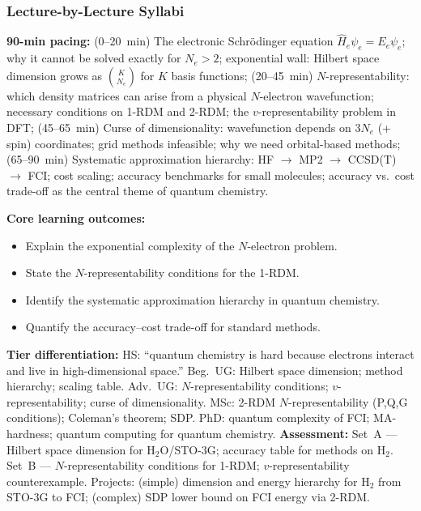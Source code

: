 \documentclass[11pt,a4paper]{article}
\begin{document}
\subsubsection*{Lecture-by-Lecture Syllabi}

\begin{tcolorbox}[chembox, title={Module~III.2 --- Lecture L01: The Quantum Many-Body Problem in Chemistry}]
\textbf{90-min pacing:} (0--20~min) The electronic Schr\"odinger equation $\hat{H}_e\psi_e=E_e\psi_e$; why it cannot be solved exactly for $N_e>2$; exponential wall: Hilbert space dimension grows as $\binom{K}{N_e}$ for $K$ basis functions; (20--45~min) $N$-representability: which density matrices can arise from a physical $N$-electron wavefunction; necessary conditions on 1-RDM and 2-RDM; the $v$-representability problem in DFT; (45--65~min) Curse of dimensionality: wavefunction depends on $3N_e$ (+ spin) coordinates; grid methods infeasible; why we need orbital-based methods; (65--90~min) Systematic approximation hierarchy: HF $\to$ MP2 $\to$ CCSD(T) $\to$ FCI; cost scaling; accuracy benchmarks for small molecules; accuracy vs.\ cost trade-off as the central theme of quantum chemistry.

\medskip\textbf{Core learning outcomes:}
\begin{itemize}[leftmargin=1.4em,topsep=2pt,itemsep=1pt]
  \item Explain the exponential complexity of the $N$-electron problem.
  \item State the $N$-representability conditions for the 1-RDM.
  \item Identify the systematic approximation hierarchy in quantum chemistry.
  \item Quantify the accuracy--cost trade-off for standard methods.
\end{itemize}
\medskip\textbf{Tier differentiation:}
HS: ``quantum chemistry is hard because electrons interact and live in high-dimensional space.''
Beg.\ UG: Hilbert space dimension; method hierarchy; scaling table.
Adv.\ UG: $N$-representability conditions; $v$-representability; curse of dimensionality.
MSc: 2-RDM $N$-representability (P,Q,G conditions); Coleman's theorem; SDP.
PhD: quantum complexity of FCI; MA-hardness; quantum computing for quantum chemistry.
\medskip\textbf{Assessment:}
Set~A --- Hilbert space dimension for H$_2$O/STO-3G; accuracy table for methods on H$_2$.
Set~B --- $N$-representability conditions for 1-RDM; $v$-representability counterexample.
Projects: (simple) dimension and energy hierarchy for H$_2$ from STO-3G to FCI; (complex) SDP lower bound on FCI energy via 2-RDM.
\end{tcolorbox}
\end{document}
